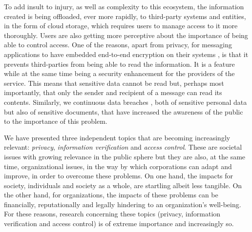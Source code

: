 To add insult to injury, as well as complexity to this ecosystem, the information created is being offloaded, ever more rapidly, to third-party systems and entities, in the form of cloud storage, which requires users to manage access to it more thoroughly. Users are also getting more perceptive about the importance of being able to control access. One of the reasons, apart from privacy, for messaging applications to have embedded end-to-end encryption on their systems \cite{rosler_more_2017}, is that it prevents third-parties from being able to read the information. It is a feature while at the same time being a security enhancement for the providers of the service. This means that sensitive data cannot be read but, perhaps most importantly, that only the sender and recipient of a message can read its contents. Similarly, we continuous data breaches \cite{edwards_hype_2016}, both of sensitive personal data but also of sensitive documents, that have increased the awareness of the public to the importance of this problem.

We have presented three independent topics that are becoming increasingly relevant: \textit{privacy}, \textit{information verification} and \textit{access control}. These are societal issues with growing relevance in the public sphere but they are also, at the same time, organizational issues, in the way by which corporations can adapt and improve, in order to overcome these problems. On one hand, the impacts for society, individuals and society as a whole, are startling albeit less tangible. On the other hand, for organizations, the impacts of these problems can be financially, reputationally and legally hindering to an organization's well-being. For these reasons, research concerning these topics (privacy, information verification and access control) is of extreme importance and increasingly so.


